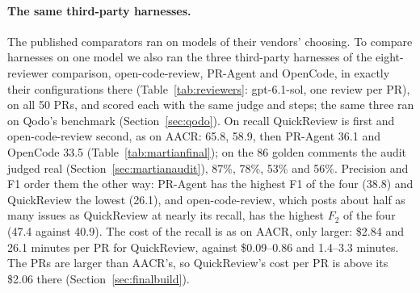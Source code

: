 \documentclass[11pt,a4paper]{article}
\newcommand{\qcr}{QuickReview}
\begin{document}
\paragraph{The same third-party harnesses.} The published comparators ran
on models of their vendors' choosing. To compare harnesses on one model we
also ran the three third-party harnesses of the eight-reviewer comparison,
open-code-review, PR-Agent and OpenCode, in exactly their configurations
there (Table~\ref{tab:reviewers}: gpt-6.1-sol, one review per PR), on all 50
PRs, and scored each with the same judge and steps; the same three ran on
Qodo's benchmark (Section~\ref{sec:qodo}). On recall \qcr{} is first and
open-code-review second, as on AACR: 65.8, 58.9, then PR-Agent 36.1 and
OpenCode 33.5 (Table~\ref{tab:martianfinal}); on the 86 golden comments the
audit judged real (Section~\ref{sec:martianaudit}), 87\%, 78\%, 53\% and
56\%. Precision and F1 order them the other way:
PR-Agent has the highest F1 of the four (38.8) and \qcr{} the lowest
(26.1), and open-code-review, which posts about half as many issues as \qcr{}
at nearly its recall, has the highest $F_2$ of the four (47.4 against 40.9).
The cost of the recall is as on AACR, only larger: \$2.84 and 26.1
minutes per PR for \qcr{}, against \$0.09--0.86 and 1.4--3.3 minutes. The
PRs are larger than AACR's, so \qcr{}'s cost per PR is above its \$2.06
there (Section~\ref{sec:finalbuild}).
\end{document}
